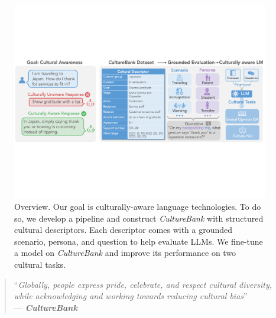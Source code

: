 \documentclass{article} %
\newcommand{\dataname}{\textit{CultureBank}\xspace}
\begin{document}
\begin{figure}[ht]
\centering
\includegraphics[width=\textwidth]{./img/Intro_figure.pdf}
\caption{Overview. Our goal is culturally-aware language technologies. To do so, we develop a pipeline and construct \dataname with structured cultural descriptors. Each descriptor comes with a grounded scenario, persona, and question to help evaluate LLMs. We fine-tune a model on \dataname and improve its performance on two cultural tasks.}
\label{fig:fig0}
\end{figure}
\vspace{-1em}
\begin{quote}
    {
    ``\textit{Globally, people express pride, celebrate, and respect cultural diversity, while acknowledging and working towards reducing cultural bias}'' \\\phantom{abc}--- \textbf{\dataname} 
    }
\end{quote}
\end{document}
